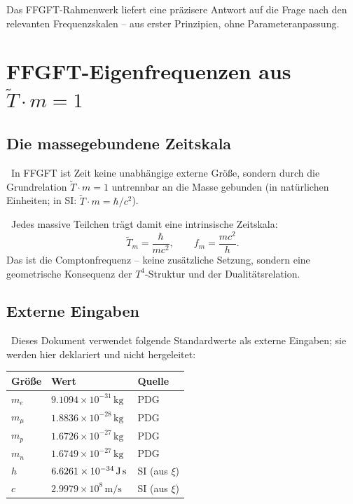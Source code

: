 Das FFGFT-Rahmenwerk liefert eine präzisere Antwort auf die Frage nach den
relevanten Frequenzskalen -- aus erster Prinzipien, ohne Parameteranpassung.

\section{FFGFT-Eigenfrequenzen aus $\tilde{T}\cdot m=1$}

\subsection{Die massegebundene Zeitskala}

\SetzM\ In FFGFT ist Zeit keine unabhängige externe Größe, sondern durch die
Grundrelation $\tilde{T}\cdot m=1$ untrennbar an die Masse gebunden (in
natürlichen Einheiten; in SI: $\tilde{T}\cdot m = \hbar/c^2$).

\KM\ Jedes massive Teilchen trägt damit eine intrinsische Zeitskala:
\begin{equation}
\tilde{T}_m = \frac{\hbar}{mc^2}, \qquad f_m = \frac{mc^2}{h}.
\label{eq:comptonfrequenz}
\end{equation}
Das ist die Comptonfrequenz -- keine zusätzliche Setzung, sondern eine
geometrische Konsequenz der $T^4$-Struktur und der Dualitätsrelation.

\subsection{Externe Eingaben}

\SetzM\ Dieses Dokument verwendet folgende Standardwerte als externe Eingaben;
sie werden hier deklariert und nicht hergeleitet:

\begin{center}
\begin{tabular}{lll}
\toprule
Größe & Wert & Quelle \\
\midrule
$m_e$   & $9.1094\times10^{-31}\,\text{kg}$ & PDG \\
$m_\mu$ & $1.8836\times10^{-28}\,\text{kg}$ & PDG \\
$m_p$   & $1.6726\times10^{-27}\,\text{kg}$ & PDG \\
$m_n$   & $1.6749\times10^{-27}\,\text{kg}$ & PDG \\
$h$     & $6.6261\times10^{-34}\,\text{J\,s}$ & SI (aus $\xi$) \\
$c$     & $2.9979\times10^{8}\,\text{m/s}$  & SI (aus $\xi$) \\
\bottomrule
\end{tabular}
\end{center}

